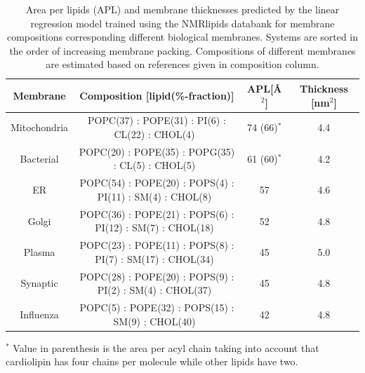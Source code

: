 \documentclass[fleqn,10pt]{wlscirep}
\begin{document}
    \begin{table}[htb]
    \caption{Area per lipids (APL) and membrane thicknesses predicted by the linear regression model trained using the NMRlipids databank for membrane compositions corresponding different biological membranes. Systems are sorted in the order of increasing membrane packing. Compositions of different membranes are estimated based on references given in composition column.}
        \centering
        \begin{tabular}{cccc}
             Membrane&  Composition [lipid(\%-fraction)]&  APL[\AA$^2$] & Thickness [nm$^2$]\\
             \hline
             Mitochondria & POPC(37) : POPE(31) : PI(6) : CL(22) : 
             CHOL(4)~\cite{vanmeer08,escriba15,casares19} & 74 (66)$^*$ & 4.4 \\
             Bacterial & POPC(20) : POPE(35) : POPG(35) : CL(5) : CHOL(5)~\cite{chwastek20}  & 61 (60)$^*$ & 4.2 \\
             ER &  POPC(54) : POPE(20) : POPS(4) : PI(11) : SM(4) : CHOL(8)~\cite{vanmeer08,escriba15,casares19} & 57 & 4.6 \\
             Golgi & POPC(36) : POPE(21) : POPS(6) : PI(12) : SM(7) : CHOL(18)~\cite{vanmeer08,escriba15,casares19} & 52 & 4.8 \\
             Plasma & POPC(23) : POPE(11) : POPS(8) : PI(7) : SM(17) : CHOL(34)~\cite{vanmeer08,escriba15,casares19} & 45 & 5.0 \\
             Synaptic & POPC(28) : POPE(20) : POPS(9) : PI(2) : SM(4) : CHOL(37)~\cite{binotti21}  &  45 & 4.8 \\
             Influenza & POPC(5) : POPE(32) : POPS(15) : SM(9) : CHOL(40)~\cite{gerl12,ivanova15} & 42 & 4.8 \\
        \end{tabular}
        \label{tab:MLpredictions}
        
        $^*$ Value in parenthesis is the area per acyl chain taking into account that cardiolipin has four chains per molecule while other lipids have two.
    \end{table}
    
\end{document}
